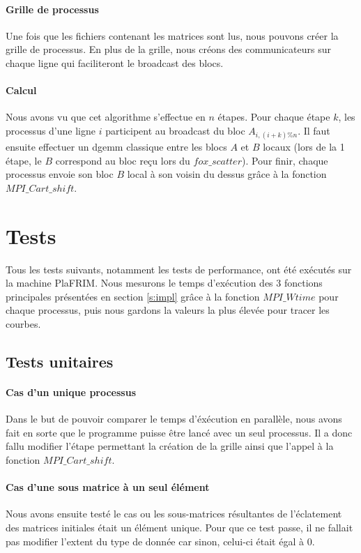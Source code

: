 \documentclass[12pt]{article}
\begin{document}
\paragraph{Grille de processus}
Une fois que les fichiers contenant les matrices sont lus, nous pouvons créer la grille de processus. En plus de la grille, nous créons des communicateurs sur chaque ligne qui faciliteront le broadcast des blocs.

\paragraph{Calcul}
Nous avons vu que cet algorithme s'effectue en $n$ étapes. Pour chaque étape $k$, les processus d'une ligne $i$ participent au broadcast du bloc $A_{i,(i+k)\%n}$. Il faut ensuite effectuer un dgemm classique entre les blocs $A$ et $B$ locaux (lors de la 1\iere{} étape, le $B$ correspond au bloc reçu lors du $fox\_scatter$). Pour finir, chaque processus envoie son bloc $B$ local à son voisin du dessus grâce à la fonction $MPI\_Cart\_shift$.

\section{Tests}
Tous les tests suivants, notamment les tests de performance, ont été exécutés sur la machine PlaFRIM. Nous mesurons le temps d'exécution des 3 fonctions principales présentées en section \ref{s:impl} grâce à la fonction $MPI\_Wtime$ pour chaque processus, puis nous gardons la valeurs la plus élevée pour tracer les courbes.

\subsection{Tests unitaires}
\paragraph{Cas d'un unique processus}
Dans le but de pouvoir comparer le temps d'éxécution en parallèle, nous avons fait en sorte que le programme puisse être lancé avec un seul processus. Il a donc fallu modifier l'étape permettant la création de la grille ainsi que l'appel à la fonction $MPI\_Cart\_shift$.

\paragraph{Cas d'une sous matrice à un seul élément}
Nous avons ensuite testé le cas ou les sous-matrices résultantes de l'éclatement des matrices initiales était un élément unique. Pour que ce test passe, il ne fallait pas modifier l'extent du type de donnée car sinon, celui-ci était égal à $0$.
\end{document}

